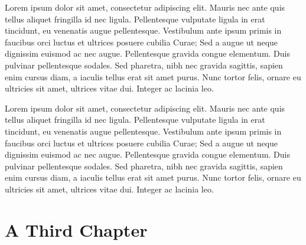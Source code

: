 \documentclass[sans,math-serif,solid,chem,code,notes,plot]{bmc}
\begin{document}
\newpage
Lorem ipsum dolor sit amet, consectetur adipiscing elit. Mauris nec ante quis tellus aliquet fringilla id nec ligula. Pellentesque vulputate ligula in erat tincidunt, eu venenatis augue pellentesque. Vestibulum ante ipsum primis in faucibus orci luctus et ultrices posuere cubilia Curae; Sed a augue ut neque dignissim euismod ac nec augue. Pellentesque gravida congue elementum. Duis pulvinar pellentesque sodales. Sed pharetra, nibh nec gravida sagittis, sapien enim cursus diam, a iaculis tellus erat sit amet purus. Nunc tortor felis, ornare eu ultricies sit amet, ultrices vitae dui. Integer ac lacinia leo.

\begin{center}
\end{center}


\newpage
Lorem ipsum dolor sit amet, consectetur adipiscing elit. Mauris nec ante quis tellus aliquet fringilla id nec ligula. Pellentesque vulputate ligula in erat tincidunt, eu venenatis augue pellentesque. Vestibulum ante ipsum primis in faucibus orci luctus et ultrices posuere cubilia Curae; Sed a augue ut neque dignissim euismod ac nec augue. Pellentesque gravida congue elementum. Duis pulvinar pellentesque sodales. Sed pharetra, nibh nec gravida sagittis, sapien enim cursus diam, a iaculis tellus erat sit amet purus. Nunc tortor felis, ornare eu ultricies sit amet, ultrices vitae dui. Integer ac lacinia leo.

\chapter{A Third Chapter}
\end{document}
